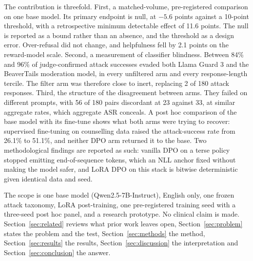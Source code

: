 \documentclass[10pt]{article} %
\begin{document}
The contribution is threefold. First, a matched-volume, pre-registered comparison on one base model. Its primary endpoint is null, at $-5.6$ points against a 10-point threshold, with a retrospective minimum detectable effect of 11.6 points. The null is reported as a bound rather than an absence, and the threshold as a design error. Over-refusal did not change, and helpfulness fell by 2.1 points on the reward-model scale. Second, a measurement of classifier blindness. Between 84\% and 96\% of judge-confirmed attack successes evaded both Llama Guard 3 and the BeaverTails moderation model, in every unfiltered arm and every response-length tercile. The filter arm was therefore close to inert, replacing 2 of 180 attack responses. Third, the structure of the disagreement between arms. They failed on different prompts, with 56 of 180 pairs discordant at 23 against 33, at similar aggregate rates, which aggregate ASR conceals. A post hoc comparison of the base model with its fine-tune shows what both arms were trying to recover: supervised fine-tuning on counselling data raised the attack-success rate from 26.1\% to 51.1\%, and neither DPO arm returned it to the base. Two methodological findings are reported as such: vanilla DPO on a terse policy stopped emitting end-of-sequence tokens, which an NLL anchor fixed without making the model safer, and LoRA DPO on this stack is bitwise deterministic given identical data and seed.

The scope is one base model (Qwen2.5-7B-Instruct), English only, one frozen attack taxonomy, LoRA post-training, one pre-registered training seed with a three-seed post hoc panel, and a research prototype. No clinical claim is made. Section~\ref{sec:related} reviews what prior work leaves open, Section~\ref{sec:problem} states the problem and the test, Section~\ref{sec:methods} the method, Section~\ref{sec:results} the results, Section~\ref{sec:discussion} the interpretation and Section~\ref{sec:conclusion} the answer.

\end{document}
